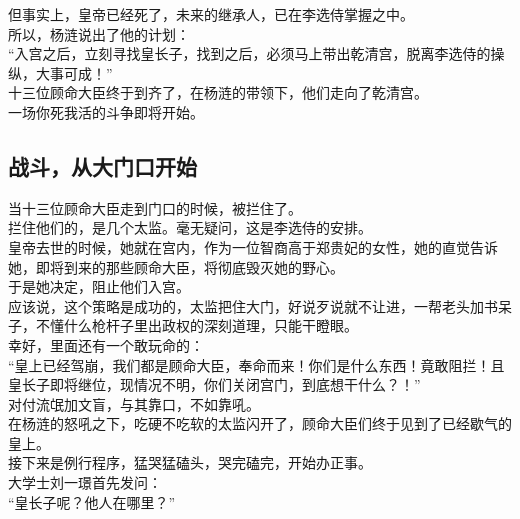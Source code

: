 \begin{multicols}{\theparacolNo}
但事实上，皇帝已经死了，未来的继承人，已在李选侍掌握之中。\\

所以，杨涟说出了他的计划：\\

“入宫之后，立刻寻找皇长子，找到之后，必须马上带出乾清宫，脱离李选侍的操纵，大事可成！”\\

十三位顾命大臣终于到齐了，在杨涟的带领下，他们走向了乾清宫。\\

一场你死我活的斗争即将开始。\\

\subsection{战斗，从大门口开始}
当十三位顾命大臣走到门口的时候，被拦住了。\\

拦住他们的，是几个太监。毫无疑问，这是李选侍的安排。\\

皇帝去世的时候，她就在宫内，作为一位智商高于郑贵妃的女性，她的直觉告诉她，即将到来的那些顾命大臣，将彻底毁灭她的野心。\\

于是她决定，阻止他们入宫。\\

应该说，这个策略是成功的，太监把住大门，好说歹说就不让进，一帮老头加书呆子，不懂什么枪杆子里出政权的深刻道理，只能干瞪眼。\\

幸好，里面还有一个敢玩命的：\\

“皇上已经驾崩，我们都是顾命大臣，奉命而来！你们是什么东西！竟敢阻拦！且皇长子即将继位，现情况不明，你们关闭宫门，到底想干什么？！”\\

对付流氓加文盲，与其靠口，不如靠吼。\\

在杨涟的怒吼之下，吃硬不吃软的太监闪开了，顾命大臣们终于见到了已经歇气的皇上。\\

接下来是例行程序，猛哭猛磕头，哭完磕完，开始办正事。\\

大学士刘一璟首先发问：\\

“皇长子呢？他人在哪里？”\\


\end{multicols}
